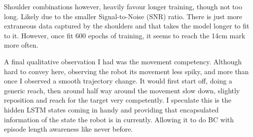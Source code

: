 Shoulder combinations however, heavily favour longer training, though not too long. Likely due to the smaller Signal-to-Noise (SNR) ratio. There is just more extraneous data captured by the shoulders and that takes the model longer to fit to it. However, once fit 600 epochs of training, it seems to reach the 14cm mark more often. 

A final qualitative observation I had was the movement competency. Although hard to convey here, observing the robot its movement less spiky, and more than once I observed a smooth trajectory change. It would first start off, doing a generic reach, then around half way around the movement slow down, slightly reposition and reach for the target very competently. I speculate this is the hidden LSTM states coming in handy and providing that encapsulated information of the state the robot is in currently. Allowing it to do BC with episode length awareness like never before.


